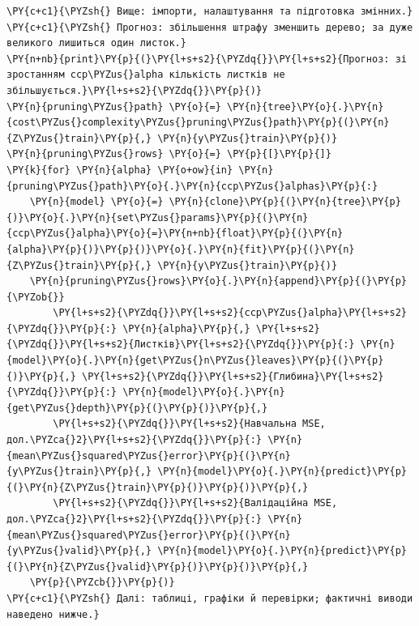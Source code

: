 \begin{Verbatim}[commandchars=\\\{\}]
\PY{c+c1}{\PYZsh{} Вище: імпорти, налаштування та підготовка змінних.}
\PY{c+c1}{\PYZsh{} Прогноз: збільшення штрафу зменшить дерево; за дуже великого лишиться один листок.}
\PY{n+nb}{print}\PY{p}{(}\PY{l+s+s2}{\PYZdq{}}\PY{l+s+s2}{Прогноз: зі зростанням ccp\PYZus{}alpha кількість листків не збільшується.}\PY{l+s+s2}{\PYZdq{}}\PY{p}{)}
\PY{n}{pruning\PYZus{}path} \PY{o}{=} \PY{n}{tree}\PY{o}{.}\PY{n}{cost\PYZus{}complexity\PYZus{}pruning\PYZus{}path}\PY{p}{(}\PY{n}{Z\PYZus{}train}\PY{p}{,} \PY{n}{y\PYZus{}train}\PY{p}{)}
\PY{n}{pruning\PYZus{}rows} \PY{o}{=} \PY{p}{[}\PY{p}{]}
\PY{k}{for} \PY{n}{alpha} \PY{o+ow}{in} \PY{n}{pruning\PYZus{}path}\PY{o}{.}\PY{n}{ccp\PYZus{}alphas}\PY{p}{:}
    \PY{n}{model} \PY{o}{=} \PY{n}{clone}\PY{p}{(}\PY{n}{tree}\PY{p}{)}\PY{o}{.}\PY{n}{set\PYZus{}params}\PY{p}{(}\PY{n}{ccp\PYZus{}alpha}\PY{o}{=}\PY{n+nb}{float}\PY{p}{(}\PY{n}{alpha}\PY{p}{)}\PY{p}{)}\PY{o}{.}\PY{n}{fit}\PY{p}{(}\PY{n}{Z\PYZus{}train}\PY{p}{,} \PY{n}{y\PYZus{}train}\PY{p}{)}
    \PY{n}{pruning\PYZus{}rows}\PY{o}{.}\PY{n}{append}\PY{p}{(}\PY{p}{\PYZob{}}
        \PY{l+s+s2}{\PYZdq{}}\PY{l+s+s2}{ccp\PYZus{}alpha}\PY{l+s+s2}{\PYZdq{}}\PY{p}{:} \PY{n}{alpha}\PY{p}{,} \PY{l+s+s2}{\PYZdq{}}\PY{l+s+s2}{Листків}\PY{l+s+s2}{\PYZdq{}}\PY{p}{:} \PY{n}{model}\PY{o}{.}\PY{n}{get\PYZus{}n\PYZus{}leaves}\PY{p}{(}\PY{p}{)}\PY{p}{,} \PY{l+s+s2}{\PYZdq{}}\PY{l+s+s2}{Глибина}\PY{l+s+s2}{\PYZdq{}}\PY{p}{:} \PY{n}{model}\PY{o}{.}\PY{n}{get\PYZus{}depth}\PY{p}{(}\PY{p}{)}\PY{p}{,}
        \PY{l+s+s2}{\PYZdq{}}\PY{l+s+s2}{Навчальна MSE, дол.\PYZca{}2}\PY{l+s+s2}{\PYZdq{}}\PY{p}{:} \PY{n}{mean\PYZus{}squared\PYZus{}error}\PY{p}{(}\PY{n}{y\PYZus{}train}\PY{p}{,} \PY{n}{model}\PY{o}{.}\PY{n}{predict}\PY{p}{(}\PY{n}{Z\PYZus{}train}\PY{p}{)}\PY{p}{)}\PY{p}{,}
        \PY{l+s+s2}{\PYZdq{}}\PY{l+s+s2}{Валідаційна MSE, дол.\PYZca{}2}\PY{l+s+s2}{\PYZdq{}}\PY{p}{:} \PY{n}{mean\PYZus{}squared\PYZus{}error}\PY{p}{(}\PY{n}{y\PYZus{}valid}\PY{p}{,} \PY{n}{model}\PY{o}{.}\PY{n}{predict}\PY{p}{(}\PY{n}{Z\PYZus{}valid}\PY{p}{)}\PY{p}{)}\PY{p}{,}
    \PY{p}{\PYZcb{}}\PY{p}{)}
\PY{c+c1}{\PYZsh{} Далі: таблиці, графіки й перевірки; фактичні виводи наведено нижче.}
\end{Verbatim}

